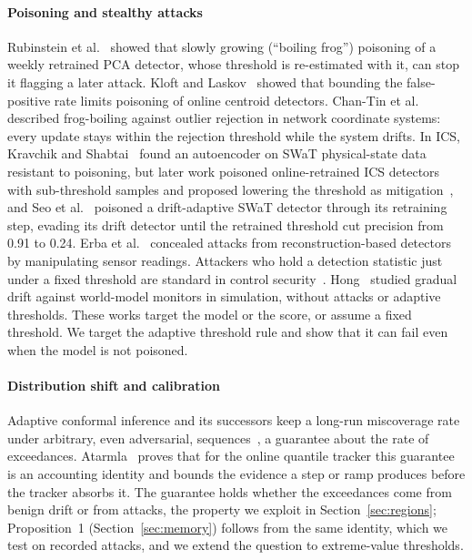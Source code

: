\documentclass[letterpaper,twocolumn,10pt]{article}
\begin{document}
\paragraph{Poisoning and stealthy attacks}
Rubinstein et al.~\cite{rubinstein2009antidote} showed that slowly growing (``boiling frog'') poisoning
of a weekly retrained PCA detector, whose threshold is re-estimated with it, can stop it flagging a
later attack. Kloft and Laskov~\cite{kloft2010online, kloft2012security} showed that bounding the
false-positive rate limits poisoning of online centroid detectors. Chan-Tin et
al.~\cite{chantin2009frog, chantin2011frog} described frog-boiling against outlier rejection in network
coordinate systems: every update stays within the rejection threshold while the system drifts. In ICS,
Kravchik and Shabtai~\cite{kravchik2020frog} found an autoencoder on SWaT physical-state data resistant
to poisoning, but later work poisoned online-retrained ICS detectors with sub-threshold samples and
proposed lowering the threshold as mitigation~\cite{kravchik2021poisoning}, and Seo
et al.~\cite{seo2026retraining} poisoned a drift-adaptive SWaT detector through its retraining step,
evading its drift detector until the retrained threshold cut precision from 0.91 to 0.24. Erba
et al.~\cite{erba2020concealment} concealed attacks from reconstruction-based detectors by manipulating
sensor readings. Attackers who hold a detection statistic just under a fixed threshold are standard in
control security~\cite{cardenas2011process, urbina2016stealthy}. Hong~\cite{hong2026boiling} studied
gradual drift against world-model monitors in simulation, without attacks or adaptive thresholds. These
works target the model or the score, or assume a fixed threshold. We target the adaptive threshold rule
and show that it can fail even when the model is not poisoned.

\paragraph{Distribution shift and calibration}
Adaptive conformal inference and its successors keep a long-run miscoverage rate under arbitrary, even
adversarial, sequences~\cite{gibbs2021aci, bastani2022multivalid}, a guarantee about the rate of
exceedances. Atarmla~\cite{atarmla2026price} proves that for the online quantile tracker this guarantee
is an accounting identity and bounds the evidence a step or ramp produces before the tracker absorbs
it. The guarantee holds whether the exceedances come from benign drift or from attacks, the property we
exploit in Section~\ref{sec:regions}; Proposition~1 (Section~\ref{sec:memory}) follows from the same
identity, which we test on recorded attacks, and we extend the question to extreme-value thresholds.
\end{document}
